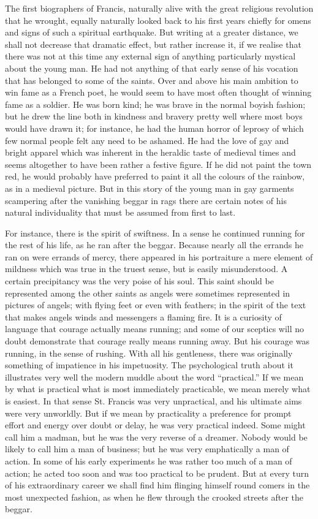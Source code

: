 \documentclass{book}
\begin{document}
The first biographers of Francis, naturally alive with the great religious revolution that he wrought, equally naturally looked back to his first years chiefly for omens and signs of such a spiritual earthquake. But writing at a greater distance, we shall not decrease that dramatic effect, but rather increase it, if we realise that there was not at this time any external sign of anything particularly mystical about the young man. He had not anything of that early sense of his vocation that has belonged to some of the saints. Over and above his main ambition to win fame as a French poet, he would seem to have most often thought of winning fame as a soldier. He was born kind; he was brave in the normal boyish fashion; but he drew the line both in kindness and bravery pretty well where most boys would have drawn it; for instance, he had the human horror of leprosy of which few normal people felt any need to be ashamed. He had the love of gay and bright apparel which was inherent in the heraldic taste of medieval times and seems altogether to have been rather a festive figure. If he did not paint the town red, he would probably have preferred to paint it all the colours of the rainbow, as in a medieval picture. But in this story of the young man in gay garments scampering after the vanishing beggar in rags there are certain notes of his natural individuality that must be assumed from first to last.

For instance, there is the spirit of swiftness. In a sense he continued running for the rest of his life, as he ran after the beggar. Because nearly all the errands he ran on were errands of mercy, there appeared in his portraiture a mere element of mildness which was true in the truest sense, but is easily misunderstood. A certain precipitancy was the very poise of his soul. This saint should be represented among the other saints as angels were sometimes represented in pictures of angels; with flying feet or even with feathers; in the spirit of the text that makes angels winds and messengers a flaming fire. It is a curiosity of language that courage actually means running; and some of our sceptics will no doubt demonstrate that courage really means running away. But his courage was running, in the sense of rushing. With all his gentleness, there was originally something of impatience in his impetuosity. The psychological truth about it illustrates very well the modern muddle about the word “practical.” If we mean by what is practical what is most immediately practicable, we mean merely what is easiest. In that sense St. Francis was very unpractical, and his ultimate aims were very unworldly. But if we mean by practicality a preference for prompt effort and energy over doubt or delay, he was very practical indeed. Some might call him a madman, but he was the very reverse of a dreamer. Nobody would be likely to call him a man of business; but he was very emphatically a man of action. In some of his early experiments he was rather too much of a man of action; he acted too soon and was too practical to be prudent. But at every turn of his extraordinary career we shall find him flinging himself round comers in the most unexpected fashion, as when he flew through the crooked streets after the beggar.
\end{document}
